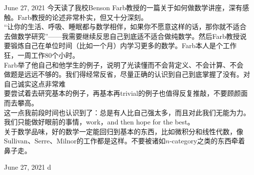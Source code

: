 \documentclass[11pt]{article}
\newenvironment{loggentry}[1]{\noindent#1\medbreak}{\vspace{0.5cm}}
\begin{document}
\begin{loggentry}{June 27, 2021}
今天读了我校Benson Farb教授的一篇关于如何做数学讲座，深有感触。Farb教授的论述非常朴实，但又十分深刻。\\

“让你的生活、呼吸、睡眠都与数学相伴，如果你不愿意这样的话，那你就不适合去做数学研究”——我需要继续反思自己到底适不适合做纯数学。然后Farb教授说要锻炼自己在单位时间（比如一个月）内学习更多的数学。Farb本人是个工作狂，一周工作80个小时。\\

Farb举了他自己和他学生的例子，说明了光读懂而不会背定义、不会计算、不会做题是远远不够的。我们得经常反省，尽量正确的认识到自己到底掌握了没有。对自己诚实这点非常难\\

要尝试着去研究基本的例子，再基本再trivial的例子也值得反复推敲，不要顾颜面而去攀高。\\

这一点我前段时间也认识到了：总是有人比自己强太多，而且对此我们无能为力。我们只能做好眼前的事情，work，and then hope for the best。\\

关于数学品味，好的数学一定能回归到基本的东西，比如微积分和线性代数，像Sullivan、Serre、Milnor的工作都是这样。不要被诸如$n$-category之类的东西牵着鼻子走。
\end{loggentry}

\begin{loggentry}{June 27, 2021}
d
\end{loggentry}
\end{document}
